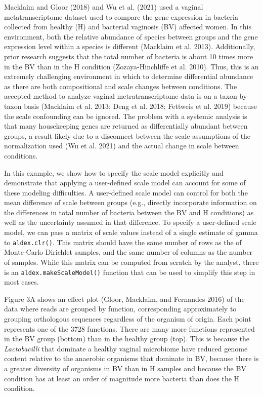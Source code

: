 \documentclass[
]{article}
\begin{document}
Macklaim and Gloor (2018) and Wu et al. (2021) used a vaginal
metatranscriptome dataset used to compare the gene expression in
bacteria collected from healthy (H) and bacterial vaginosis (BV)
affected women. In this environment, both the relative abundance of
species between groups and the gene expression level within a species is
different (Macklaim et al. 2013). Additionally, prior research suggests
that the total number of bacteria is about 10 times more in the BV than
in the H condition (Zozaya-Hinchliffe et al. 2010). Thus, this is an
extremely challenging environment in which to determine differential
abundance as there are both compositional and scale changes between
conditions. The accepted method to analyze vaginal metratranscriptome
data is on a taxon-by-taxon basis (Macklaim et al. 2013; Deng et al.
2018; Fettweis et al. 2019) because the scale confounding can be
ignored. The problem with a systemic analysis is that many housekeeping
genes are returned as differentially abundant between groups, a result
likely due to a disconnect between the scale assumptions of the
normalization used (Wu et al. 2021) and the actual change in scale
between conditions.

In this example, we show how to specify the scale model explicitly and
demonstrate that applying a user-defined scale model can account for
some of these modeling difficulties. A user-defined scale model can
control for both the mean difference of scale between groups (e.g.,
directly incorporate information on the differences in total number of
bacteria between the BV and H conditions) as well as the uncertainty
assumed in that difference. To specify a user-defined scale model, we
can pass a matrix of scale values instead of a single estimate of gamma
to \texttt{aldex.clr()}. This matrix should have the same number of rows
as the of Monte-Carlo Dirichlet samples, and the same number of columns
as the number of samples. While this matrix can be computed from scratch
by the analyst, there is an \texttt{aldex.makeScaleModel()} function
that can be used to simplify this step in most cases.

Figure 3A shows an effect plot (Gloor, Macklaim, and Fernandes 2016) of
the data where reads are grouped by function, corresponding
approximately to grouping orthologous sequences regardless of the
organism of origin. Each point represents one of the 3728 functions.
There are many more functions represented in the BV group (bottom) than
in the healthy group (top). This is because the \textit{Lactobacilli}
that dominate a healthy vaginal microbiome have reduced genome content
relative to the anaerobic organisms that dominate in BV, because there
is a greater diversity of organisms in BV than in H samples and because
the BV condition has at least an order of magnitude more bacteria than
does the H condition.
\end{document}
